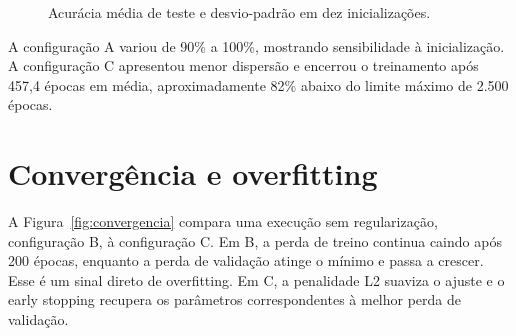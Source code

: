 \documentclass[12pt,a4paper,oneside,openany,chapter=TITLE,section=TITLE,subsection=TITLE,brazil]{abntex2}
\newcommand{\pct}[1]{#1\%}
\begin{document}
\begin{figure}[H]
\centering
{}
\caption{Acurácia média de teste e desvio-padrão em dez inicializações.}
\label{fig:acuracia}
\end{figure}

A configuração A variou de \pct{90} a \pct{100}, mostrando sensibilidade à inicialização. A configuração C apresentou menor dispersão e encerrou o treinamento após 457,4 épocas em média, aproximadamente \pct{82} abaixo do limite máximo de 2.500 épocas.

\section{Convergência e overfitting}

A Figura~\ref{fig:convergencia} compara uma execução sem regularização, configuração B, à configuração C. Em B, a perda de treino continua caindo após 200 épocas, enquanto a perda de validação atinge o mínimo e passa a crescer. Esse é um sinal direto de overfitting. Em C, a penalidade L2 suaviza o ajuste e o early stopping recupera os parâmetros correspondentes à melhor perda de validação.
\end{document}
